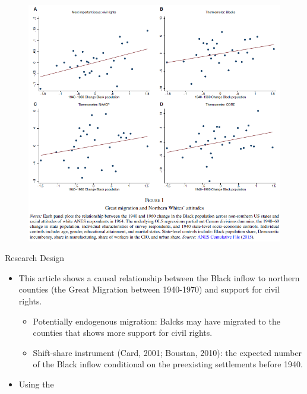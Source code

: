 \documentclass[dvipdfmx,11pt]{beamer}
\begin{document}
\begin{frame}{}
  \begin{figure}
    \centering
    \includegraphics[scale = .45]{fig_tab/os20220708/F1.png}
  \end{figure}
\end{frame}

\begin{frame}{Research Design}
  \begin{itemize}
    \item This article shows a causal relationship between the Black inflow to northern counties (the Great Migration between 1940-1970) and support for civil rights.
    \begin{itemize}
      \item Potentially endogenous migration: Balcks may have migrated to the counties that shows more support for civil rights.
      \item Shift-share instrument (Card, 2001; Boustan, 2010): the expected number of the Black inflow conditional on the preexisting settlements before 1940.
    \end{itemize}
    \item Using the %
  \end{itemize}
\end{frame}
\end{document}
